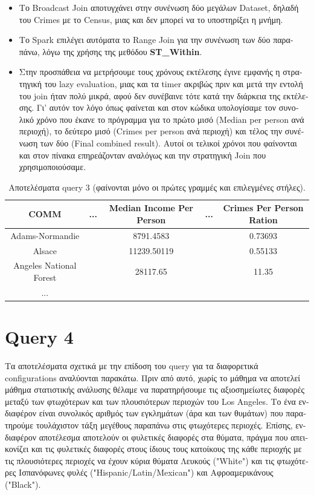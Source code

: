\documentclass[a4paper,12pt]{article}
\begin{document}
\begin{otherlanguage}{greek}
\begin{itemize}
    \item Το Broadcast Join αποτυγχάνει στην συνένωση δύο μεγάλων Dataset, δηλαδή του Crimes με το Census, μιας και δεν μπορεί να το υποστηρίξει η μνήμη.
    \item Το Spark επιλέγει αυτόματα το Range Join για την συνένωση των δύο παραπάνω, λόγω της χρήσης της μεθόδου \textbf{ST\_Within}.
    \item Στην προσπάθεια να μετρήσουμε τους χρόνους εκτέλεσης έγινε εμφανής η στρατηγική του lazy evaluation, μιας και τα timer ακριβώς πριν και μετά την εντολή του join ήταν πολύ μικρά, αφού δεν συνέβαινε τότε κατά την διάρκεια της εκτέλεσης. Γι' αυτόν τον λόγο όπως φαίνεται και στον κώδικα υπολογίσαμε τον συνολικό χρόνο που έκανε το πρόγραμμα για το πρώτο μισό (Median per person ανά περιοχή), το δεύτερο μισό (Crimes per person ανά περιοχή) και τέλος την συνένωση των δύο (Final combined result). Αυτοί οι τελικοί χρόνοι που φαίνονται και στον πίνακα επηρεάζονταν αναλόγως και την στρατηγική Join που χρησιμοποιούσαμε.
\end{itemize}
	\begin{table}[h]
		\centering
		\begin{tabular}{ccccc}
			COMM & ... & Median Income Per Person & ... & 
			Crimes Per Person Ration \\
			\hline
			Adams-Normandie & & 8791.4583 & & 0.73693 \\ 
			Alsace & & 11239.50119 & & 0.55133 \\
			Angeles National Forest & & 28117.65 & & 11.35 \\
			...
		\end{tabular}
		\caption{Aποτελέσματα query 3 (φαίνονται μόνο οι 
		πρώτες γραμμές και επιλεγμένες στήλες).}
	\end{table}
	\FloatBarrier

\section*{Query 4}
	\FloatBarrier
	Τα αποτελέσματα σχετικά με την επίδοση του query για τα διαφορετικά configurations αναλύονται παρακάτω. Πριν από αυτό, χωρίς το μάθημα να αποτελεί μάθημα στατιστικής ανάλυσης θέλαμε να παρατηρήσουμε τις αξιοσημείωτες διαφορές μεταξύ των φτωχότερων και των πλουσιότερων περιοχών του Los Angeles. Το ένα ενδιαφέρον είναι συνολικός αριθμός των εγκλημάτων (άρα και των θυμάτων) που παρατηρούμε τουλάχιστον τάξη μεγέθους παραπάνω στις φτωχότερες περιοχές. Επίσης, ενδιαφέρον αποτέλεσμα αποτελούν οι φυλετικές διαφορές στα θύματα, πράγμα που απεικονίζει και τις φυλετικές διαφορές στους ίδιους τους κατοίκους της κάθε περιοχής με τις πλουσιότερες περιοχές να έχουν κύρια θύματα Λευκούς ("White") και τις φτωχότερες Ισπανόφωνες φυλές ("Hispanic/Latin/Mexican") και Αφροαμερικάνους ("Black").


\end{otherlanguage}
\end{document}
